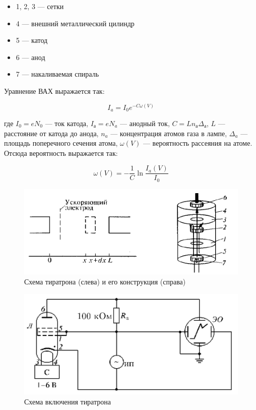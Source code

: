 \documentclass[a4paper, 12pt]{article}
\begin{document}
\begin{itemize}
    \item 1, 2, 3 --- сетки
    \item 4 --- внешний металлический цилиндр
    \item 5 --- катод
    \item 6 --- анод
    \item 7 --- накаливаемая спираль
\end{itemize}

Уравнение ВАХ выражается так:

\begin{equation}
    I_a = I_0 e^{-C \omega(V)}
\end{equation}

где $I_0 = eN_0$ --- ток катода, $I_а = e N_a$ --- анодный ток, $C = L n_а \Delta_а$, $L$ --- расстояние от катода до анода, $n_a$ --- концентрация атомов газа в лампе, $\Delta_a$ --- площадь поперечного сечения атома, $\omega (V)$ --- вероятность рассеяния на атоме. Отсюда вероятность выражается так:

\begin{equation}
    \omega (V) = - \frac{1}{C} \ln \frac{I_a(V)}{I_0}
    \label{eq:prob}
\end{equation}

\begin{figure}[!h]
    \includegraphics[scale = 0.4]{Workplace1}
    \centering
    \caption{Схема тиратрона (слева) и его конструкция (справа)}
    \label{pic:work1}
\end{figure}

\begin{figure}[!h]
    \includegraphics[scale = 0.4]{Workplace2}
    \centering
    \caption{Схема включения тиратрона}
    \label{pic:work2}
\end{figure}
\end{document}
